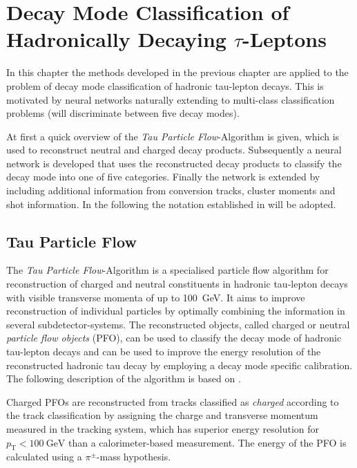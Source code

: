 \chapter{Decay Mode Classification of Hadronically Decaying $\tau$-Leptons}
\label{sec:decaymode}

In this chapter the methods developed in the previous chapter are applied to the
problem of decay mode classification of hadronic tau-lepton decays. This is
motivated by neural networks naturally extending to multi-class classification
problems (will discriminate between five decay modes).

At first a quick overview of the \emph{Tau Particle Flow}-Algorithm is given,
which is used to reconstruct neutral and charged decay products. Subsequently a
neural network is developed that uses the reconstructed decay products to
classify the decay mode into one of five categories. Finally the network is
extended by including additional information from conversion tracks, cluster
moments and shot information. In the following the notation established in
\cite{atlas:taurec:decaymodes} will be adopted.


\section{Tau Particle Flow}
\label{sec:tau_pflow}

The \emph{Tau Particle Flow}-Algorithm is a specialised particle flow algorithm
for reconstruction of charged and neutral constituents in hadronic tau-lepton
decays with visible transverse momenta of up to \SI{100}{\giga\electronvolt}. It
aims to improve reconstruction of individual particles by optimally combining
the information in several subdetector-systems. The reconstructed objects,
called charged or neutral \emph{particle flow objects} (PFO), can be used to
classify the decay mode of hadronic tau-lepton decays and can be used to improve
the energy resolution of the reconstructed hadronic tau decay by employing a
decay mode specific calibration. The following description of the algorithm is
based on \cite{atlas:taurec:decaymodes}.

Charged PFOs  are reconstructed from tracks
classified as \emph{charged} according to the track classification by assigning
the charge and transverse momentum measured in the tracking system, which has
superior energy resolution for $p_\text{T} < \SI{100}{\giga\electronvolt}$ than
a calorimeter-based measurement. The energy of the PFO is calculated using a
$\pi^\pm$-mass hypothesis. 

